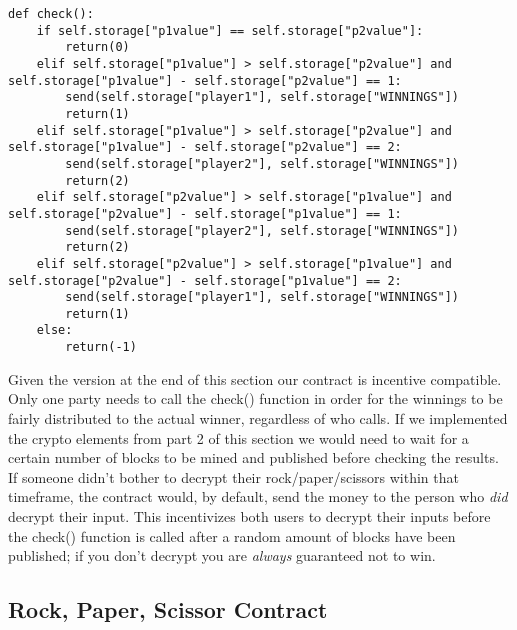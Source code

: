 \documentclass[12pt]{article}
\begin{document}
\begin{lstlisting}
def check():
	if self.storage["p1value"] == self.storage["p2value"]:
		return(0)
	elif self.storage["p1value"] > self.storage["p2value"] and self.storage["p1value"] - self.storage["p2value"] == 1:
		send(self.storage["player1"], self.storage["WINNINGS"]) 
		return(1)
	elif self.storage["p1value"] > self.storage["p2value"] and self.storage["p1value"] - self.storage["p2value"] == 2:
		send(self.storage["player2"], self.storage["WINNINGS"])
		return(2)
	elif self.storage["p2value"] > self.storage["p1value"] and self.storage["p2value"] - self.storage["p1value"] == 1:
		send(self.storage["player2"], self.storage["WINNINGS"])		
		return(2)
	elif self.storage["p2value"] > self.storage["p1value"] and self.storage["p2value"] - self.storage["p1value"] == 2:
		send(self.storage["player1"], self.storage["WINNINGS"])		
		return(1)
	else:
		return(-1)
\end{lstlisting}

Given the version at the end of this section our contract is incentive compatible. Only one party needs to call the check() function in order for the winnings to be fairly distributed to the actual winner, regardless of who calls. If we implemented the crypto elements from part 2 of this section we would need to wait for a certain number of blocks to be mined and published before checking the results. If someone didn’t bother to decrypt their rock/paper/scissors within that timeframe, the contract would, by default, send the money to the person who \textit{did} decrypt their input. This incentivizes both users to decrypt their inputs before the check() function is called after a random amount of blocks have been published; if you don't decrypt you are \textit{always} guaranteed not to win.

\subsection{Rock, Paper, Scissor Contract}
\end{document}
